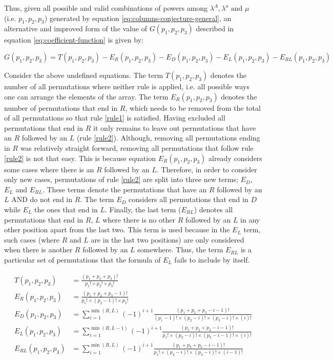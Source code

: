 Thus, given all possible and valid combinations of powers among \(\lambda^A, \lambda^o \text{ and } \mu\) (i.e. \(p_1,p_2,p_3\)) generated by equation \ref{eq:columns-conjecture-general}, an alternative and improved form of the value of \(G(p_1, p_2, p_3)\) described in equation \ref{eq:coefficient-function} is given by:

\begin{equation} \label{eq:permutation formula}
    G(p_1, p_2, p_3) = T(p_1, p_2, p_3) - E_R(p_1, p_2, p_3) - E_D(p_1, p_2, p_3) - E_L(p_1, p_2, p_3) - E_{RL}(p_1, p_2, p_3)
\end{equation}

Consider the above undefined equations. 
The term \(T(p_1,p_2,p_3)\) denotes the number of all permutations where neither rule is applied, i.e. all possible ways one can arrange the elements of the array.
The term \(E_R(p_1,p_2,p_3)\) denotes the number of permutations that end in \(R\), which needs to be removed from the total of all permutations so that rule \ref{rule1} is satisfied.
Having excluded all permutations that end in \(R\) it only remains to leave out permutations that have an \(R\) followed by an \(L\) (rule \ref{rule2}).
Although, removing all permutations ending in \(R\) was relatively straight forward, removing all permutations that follow rule \ref{rule2} is not that easy.
This is because equation \(E_R(p_1,p_2,p_3)\) already considers some cases where there is an \(R\) followed by an \(L\).
Therefore, in order to consider only new cases, permutations of rule \ref{rule2} are split into three new terms; \(E_D\), \(E_L\) and \(E_{RL}\).
These terms denote the permutations that have an \(R\) followed by an \(L\) AND do not end in \(R\).
The term \(E_D\) considers all permutations that end in \(D\) while \(E_L\) the ones that end in \(L\).
Finally, the last term (\(E_{RL}\)) denotes all permutations that end in \(R\), \(L\) where there is no other \(R\) followed by an \(L\) in any other position apart from the last two. 
This term is used because in the \(E_L\) term, such cases (where \(R\) and \(L\) are in the last two positions) are only considered when there is another \(R\) followed by an \(L\) somewhere.
Thus, the term \(E_{RL}\) is a particular set of permutations that the formula of \(E_L\) fails to include by itself.

\begin{align}
    T(p_1, p_2, p_3) &= \frac{(p_1 + p_2 + p_3)!}{p_1! \times p_2! \times p_3!} \\
    E_R(p_1, p_2, p_3) &= \frac{(p_1 + p_2 + p_3 - 1)!}{p_1! \times (p_2-1)! \times p_3!} \\
    E_D(p_1, p_2, p_3) &= \sum_{i=1}^{\min(R,L)} (-1)^{i+1} \frac{(p_1 + p_2 + p_3 - i - 1)!}{(p_1 - 1)! \times (p_2 - i)! \times (p_3 - i)! \times (i)!} \\
    E_L(p_1, p_2, p_3) &= \sum_{i=1}^{\min(R,L-1)} (-1)^{i+1} \frac{(p_1 + p_2 + p_3 - i - 1)!}{p_1! \times (p_2 - i)! \times (p_3 - i - 1)! \times (i)!} \\
    E_{RL}(p_1, p_2, p_3) &= \sum_{i=1}^{\min(R,L)} (-1)^{i+1} \frac{(p_1 + p_2 + p_3 - i - 1)!}{p_1! \times (p_2 - i)! \times (p_3 - i)! \times (i - 1)!} 
\end{align}

